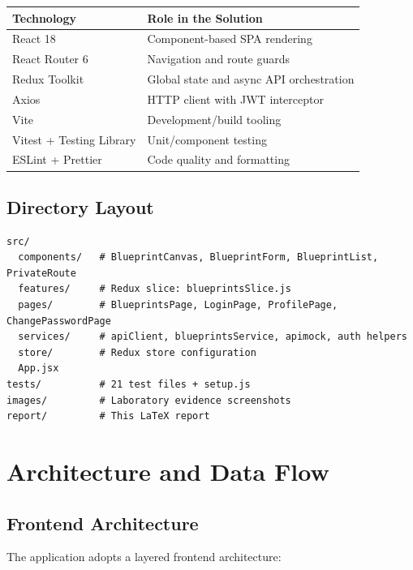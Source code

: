 \documentclass[10pt,a4paper,twocolumn]{article}
\begin{document}
\begin{center}
\small
\begin{tabular}{@{}p{2.2cm}p{4.3cm}@{}}
\toprule
\textbf{Technology} & \textbf{Role in the Solution} \\
\midrule
React 18 & Component-based SPA rendering \\
React Router 6 & Navigation and route guards \\
Redux Toolkit & Global state and async API orchestration \\
Axios & HTTP client with JWT interceptor \\
Vite & Development/build tooling \\
Vitest + Testing Library & Unit/component testing \\
ESLint + Prettier & Code quality and formatting \\
\bottomrule
\end{tabular}
\end{center}

\subsection{Directory Layout}

\begin{lstlisting}[style=bashcode, caption={Frontend repository structure (simplified)}]
src/
  components/   # BlueprintCanvas, BlueprintForm, BlueprintList, PrivateRoute
  features/     # Redux slice: blueprintsSlice.js
  pages/        # BlueprintsPage, LoginPage, ProfilePage, ChangePasswordPage
  services/     # apiClient, blueprintsService, apimock, auth helpers
  store/        # Redux store configuration
  App.jsx
tests/          # 21 test files + setup.js
images/         # Laboratory evidence screenshots
report/         # This LaTeX report
\end{lstlisting}

\section{Architecture and Data Flow}

\subsection{Frontend Architecture}

The application adopts a layered frontend architecture:
\end{document}
